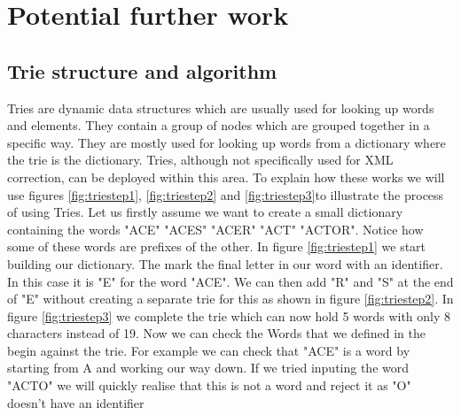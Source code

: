 \documentclass{report}
\begin{document}
\section {Potential further work}
\subsection{Trie structure and algorithm}
Tries are dynamic data structures which are usually used for looking up words and elements. They contain a group of nodes which are grouped together in a specific way. They are mostly used for looking up words from a dictionary where the trie is the dictionary. Tries, although not specifically used for XML correction, can be deployed within this area. To explain how these works we will use figures \ref{fig:triestep1}, \ref{fig:triestep2} and \ref{fig:triestep3}to illustrate the process of using Tries. Let us firstly assume we want to create a small dictionary containing the words "ACE" "ACES" "ACER" "ACT" "ACTOR". Notice how some of these words are prefixes of the other. In figure \ref{fig:triestep1} we start building our dictionary. The mark the final letter in our word with an identifier. In this case it is "E" for the word "ACE". We can then add "R" and "S" at the end of "E" without creating a separate trie for this as shown in figure \ref{fig:triestep2}. In figure \ref{fig:triestep3} we complete the trie which can now hold 5 words with only 8 characters instead of 19. Now we can check the Words that we defined in the begin against the trie. For example we can check that "ACE" is a word by starting from A and working our way down. If we tried inputing the word "ACTO" we will quickly realise that this is not a word and reject it as "O" doesn't have an identifier
\end{document}
